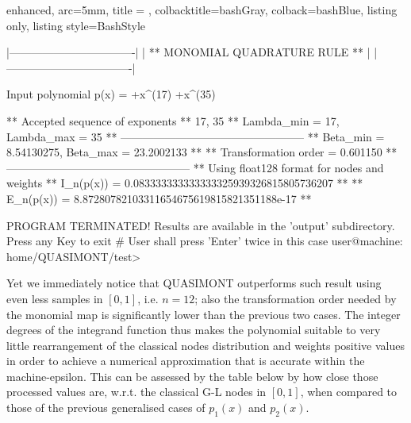 \documentclass[a4paper, twosided]{book}
\begin{document}
\vspace{0.5cm}
\begin{tcblisting}{enhanced,
                   arc=5mm,
                   title = \color{black}{\large \ttfamily Building and executing the test driver: p\_3(x)},
                   colbacktitle=bashGray,
                   colback=bashBlue,
                   listing only,
                   listing style=BashStyle}
                   
    |----------------------------------|
    |  ** MONOMIAL QUADRATURE RULE **  |
    |----------------------------------|


 Input polynomial p(x) = +x^(17) +x^(35) 

 ** Accepted sequence of exponents ** 
    {17, 35}
 ** Lambda_min = 17, Lambda_max = 35 **
 --------------------------------------------------
 ** Beta_min = 8.54130275, Beta_max = 23.2002133 **
 ** Transformation order = 0.601150 **
 --------------------------------------------------
 ** Using float128 format for nodes and weights
 ** I_n(p(x)) = 0.083333333333333325939326815805736207 **
 ** E_n(p(x)) = 8.87280782103311654675619815821351188e-17 **


PROGRAM TERMINATED! Results are available in the 'output' subdirectory.
Press any Key to exit
# User shall press 'Enter' twice in this case
user@machine: home/QUASIMONT/test>
\end{tcblisting}
\vspace{0.5cm}

\noindent
Yet we immediately notice that QUASIMONT outperforms such result using even less samples in $[0,1]$, i.e. $n=12$; also the transformation order needed by the monomial map is significantly lower than the previous two cases. The integer degrees of the integrand function thus makes the polynomial suitable to very little rearrangement of the classical nodes distribution and weights positive values in order to achieve a numerical approximation that is accurate within the machine-epsilon. This can be assessed by the table below by how close those processed values are, w.r.t. the classical G-L nodes in $[0,1]$, when compared to those of the previous generalised cases of $p_1(x)$ and $p_2(x)$.
\end{document}
